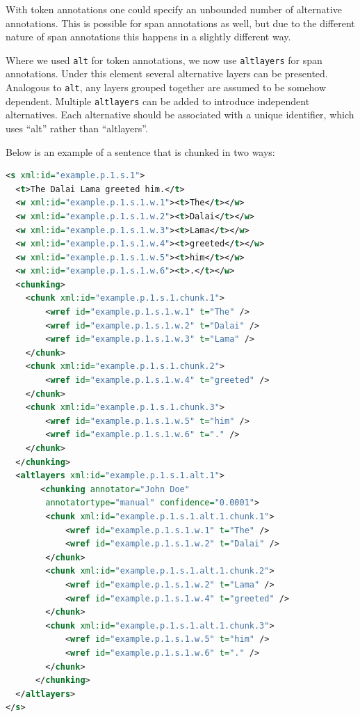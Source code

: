 \documentclass[a4paper,12pt]{report}
\begin{document}
With token annotations one could specify an unbounded number of alternative annotations. This is possible for span annotations as well, but due to the different nature of span annotations this happens in a slightly different way.

Where we used \texttt{alt} for token annotations, we now use \texttt{altlayers} for span annotations. Under this element several alternative layers can be presented. Analogous to \texttt{alt}, any layers grouped together are assumed to be somehow dependent. Multiple \texttt{altlayers} can be added to introduce independent alternatives. Each alternative should be associated with a unique identifier, which uses ``alt'' rather than ``altlayers''. 

Below is an example of a sentence that is chunked in two ways:

\begin{lstlisting}[language=xml]
<s xml:id="example.p.1.s.1">
  <t>The Dalai Lama greeted him.</t>
  <w xml:id="example.p.1.s.1.w.1"><t>The</t></w>
  <w xml:id="example.p.1.s.1.w.2"><t>Dalai</t></w>
  <w xml:id="example.p.1.s.1.w.3"><t>Lama</t></w>
  <w xml:id="example.p.1.s.1.w.4"><t>greeted</t></w>
  <w xml:id="example.p.1.s.1.w.5"><t>him</t></w>
  <w xml:id="example.p.1.s.1.w.6"><t>.</t></w>
  <chunking>
    <chunk xml:id="example.p.1.s.1.chunk.1">       
        <wref id="example.p.1.s.1.w.1" t="The" />       
        <wref id="example.p.1.s.1.w.2" t="Dalai" />       
        <wref id="example.p.1.s.1.w.3" t="Lama" />        
    </chunk>
    <chunk xml:id="example.p.1.s.1.chunk.2">       
        <wref id="example.p.1.s.1.w.4" t="greeted" />
    </chunk>
    <chunk xml:id="example.p.1.s.1.chunk.3">       
        <wref id="example.p.1.s.1.w.5" t="him" />
        <wref id="example.p.1.s.1.w.6" t="." />
    </chunk>    
  </chunking>
  <altlayers xml:id="example.p.1.s.1.alt.1">
       <chunking annotator="John Doe" 
        annotatortype="manual" confidence="0.0001">
        <chunk xml:id="example.p.1.s.1.alt.1.chunk.1">       
            <wref id="example.p.1.s.1.w.1" t="The" />       
            <wref id="example.p.1.s.1.w.2" t="Dalai" />                       
        </chunk>
        <chunk xml:id="example.p.1.s.1.alt.1.chunk.2">       
            <wref id="example.p.1.s.1.w.2" t="Lama" />                       
            <wref id="example.p.1.s.1.w.4" t="greeted" />
        </chunk>
        <chunk xml:id="example.p.1.s.1.alt.1.chunk.3">       
            <wref id="example.p.1.s.1.w.5" t="him" />
            <wref id="example.p.1.s.1.w.6" t="." />
        </chunk>    
      </chunking>   
  </altlayers>
</s>
\end{lstlisting}
\end{document}
